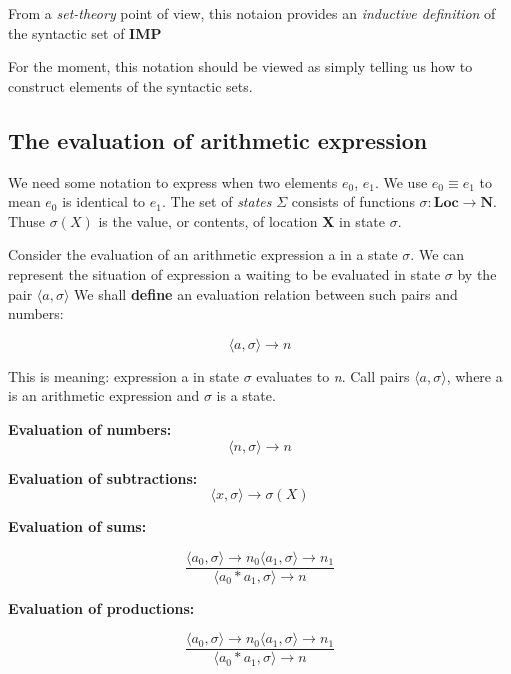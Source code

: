 \documentclass[a4paper, 12pt]{article}
\begin{document}
    From a \emph{set-theory} point of view, this notaion provides an \emph{inductive definition} of the syntactic set of \textbf{IMP}

    For the moment, this notation should be viewed as simply telling us how to construct elements of the syntactic sets.



    \subsection*{The evaluation of arithmetic expression}
    We need some notation to express when two elements \textit{$e_0$}, \textit{$e_1$}. 
    We use $e_0 \equiv e_1$ to mean \textit{$e_0$} is identical to \textit{$e_1$}.
    The set of \textit{states} $\Sigma$ consists of functions $\sigma: \textbf{Loc} \rightarrow \textbf{N}$.
    Thuse $\sigma(X)$ is the value, or contents, of location \textbf{X} in state $\sigma$.

    Consider the evaluation of an arithmetic expression a in a state $\sigma$.
    We can represent the situation of expression a waiting to be evaluated in state $\sigma$ by the pair $\langle a, \sigma \rangle $
    We shall \textbf{define} an evaluation relation between such pairs and numbers:

        \[
            \langle a, \sigma \rangle \rightarrow n
        \]

    This is meaning: expression a in state $\sigma$ evaluates to \textit{n}.
    Call pairs $\langle a, \sigma \rangle $, where a is an arithmetic expression and $\sigma$ is a state.

    \textbf{Evaluation of numbers:}
        \[
            \langle n, \sigma \rangle \rightarrow n
        \]

    \textbf{Evaluation of subtractions:}
        \[
            \langle x, \sigma \rangle \rightarrow \sigma(X)
        \]

    \textbf{Evaluation of sums:}
    
        \[
            \frac{ \langle a_0, \sigma \rangle \rightarrow n_0 \langle a_1, \sigma \rangle \rightarrow n_1}{\langle a_0 * a_1, \sigma \rangle \rightarrow n}
        \]

    \textbf{Evaluation of productions:}

        \[
            \frac{\langle a_0, \sigma \rangle \rightarrow n_0 \langle a_1, \sigma \rangle \rightarrow n_1}{ \langle a_0 * a_1, \sigma \rangle \rightarrow n}
        \]
\end{document}
